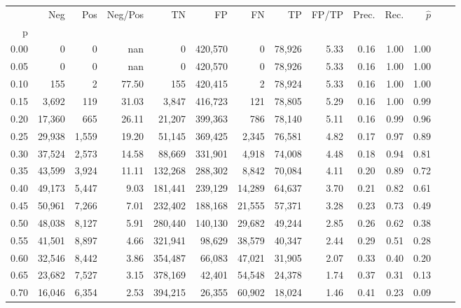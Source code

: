 \begin{tabular}{rrrrrrrrrrrrrr}
\toprule
{} &     Neg &    Pos & Neg/Pos &       TN &       FP &      FN &      TP & FP/TP & Prec. &  Rec. & $\hat{p}$ \\
p    &         &        &         &          &          &         &         &       &       &       &           \\
\midrule
0.00 &       0 &      0 &     nan &        0 &  420,570 &       0 &  78,926 &  5.33 &  0.16 &  1.00 &      1.00 \\
0.05 &       0 &      0 &     nan &        0 &  420,570 &       0 &  78,926 &  5.33 &  0.16 &  1.00 &      1.00 \\
0.10 &     155 &      2 &   77.50 &      155 &  420,415 &       2 &  78,924 &  5.33 &  0.16 &  1.00 &      1.00 \\
0.15 &   3,692 &    119 &   31.03 &    3,847 &  416,723 &     121 &  78,805 &  5.29 &  0.16 &  1.00 &      0.99 \\
0.20 &  17,360 &    665 &   26.11 &   21,207 &  399,363 &     786 &  78,140 &  5.11 &  0.16 &  0.99 &      0.96 \\
0.25 &  29,938 &  1,559 &   19.20 &   51,145 &  369,425 &   2,345 &  76,581 &  4.82 &  0.17 &  0.97 &      0.89 \\
0.30 &  37,524 &  2,573 &   14.58 &   88,669 &  331,901 &   4,918 &  74,008 &  4.48 &  0.18 &  0.94 &      0.81 \\
0.35 &  43,599 &  3,924 &   11.11 &  132,268 &  288,302 &   8,842 &  70,084 &  4.11 &  0.20 &  0.89 &      0.72 \\
0.40 &  49,173 &  5,447 &    9.03 &  181,441 &  239,129 &  14,289 &  64,637 &  3.70 &  0.21 &  0.82 &      0.61 \\
0.45 &  50,961 &  7,266 &    7.01 &  232,402 &  188,168 &  21,555 &  57,371 &  3.28 &  0.23 &  0.73 &      0.49 \\
0.50 &  48,038 &  8,127 &    5.91 &  280,440 &  140,130 &  29,682 &  49,244 &  2.85 &  0.26 &  0.62 &      0.38 \\
0.55 &  41,501 &  8,897 &    4.66 &  321,941 &   98,629 &  38,579 &  40,347 &  2.44 &  0.29 &  0.51 &      0.28 \\
0.60 &  32,546 &  8,442 &    3.86 &  354,487 &   66,083 &  47,021 &  31,905 &  2.07 &  0.33 &  0.40 &      0.20 \\
0.65 &  23,682 &  7,527 &    3.15 &  378,169 &   42,401 &  54,548 &  24,378 &  1.74 &  0.37 &  0.31 &      0.13 \\
0.70 &  16,046 &  6,354 &    2.53 &  394,215 &   26,355 &  60,902 &  18,024 &  1.46 &  0.41 &  0.23 &      0.09 \\

\end{tabular}
